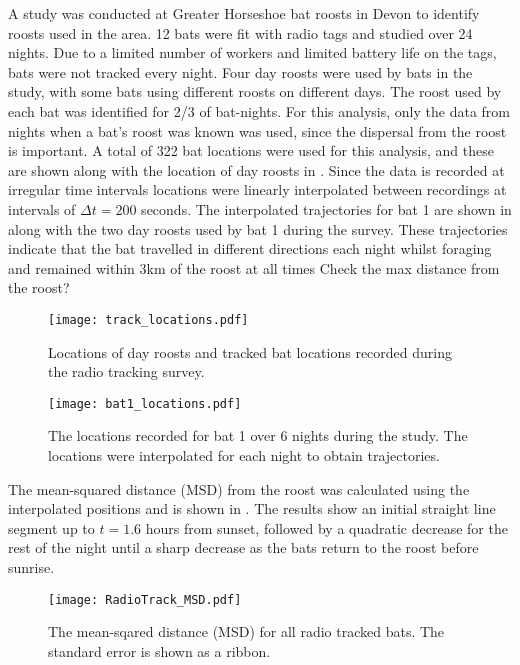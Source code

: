 A study was conducted at Greater Horseshoe bat roosts in Devon to identify roosts used in the area. 12 bats were fit with radio tags and studied over 24 nights. Due to a limited number of workers and limited battery life on the tags, bats were not tracked every night. Four day roosts were used by bats in the study, with some bats using different roosts on different days. The roost used by each bat was identified for 2/3 of bat-nights. For this analysis, only  the data from nights when a bat's roost was known was used, since the dispersal from the roost is important. A total of 322 bat locations were used for this analysis, and these are shown along with the location of day roosts in . Since the data is recorded at irregular time intervals locations were linearly interpolated between recordings at intervals of $\Delta t = 200$ seconds. The interpolated trajectories for bat 1 are shown in  along with the two day roosts used by bat 1 during the survey. These trajectories indicate that the bat travelled in different directions each night whilst foraging and remained within 3km of the roost at all times {\huge Check the max distance from the roost?}
%
\begin{figure} [h]
    \centering
        \texttt{[image: track\_locations.pdf]}
        \caption{Locations of day roosts and tracked bat locations recorded during the radio tracking survey.}
    \label{fig:radiotrack_locations}
\end{figure}
%
\begin{figure} [h]
    \centering
        \texttt{[image: bat1\_locations.pdf]}
        \caption{The locations recorded for bat 1 over 6 nights during the study. The locations were interpolated for each night to obtain trajectories.}
    \label{fig:bat1}
\end{figure}
%
The mean-squared distance (MSD) from the roost was calculated using the interpolated positions and is shown in . The results show an initial straight line segment up to $t = 1.6$ hours from sunset, followed by a quadratic decrease for the rest of the night until a sharp decrease as the bats return to the roost before sunrise.
%
\begin{figure} [h]
    \centering
        \texttt{[image: RadioTrack\_MSD.pdf]}
        \caption{The mean-sqared distance (MSD) for all radio tracked bats. The standard error is shown as a ribbon.}
    \label{fig:MSD}
\end{figure}
%
